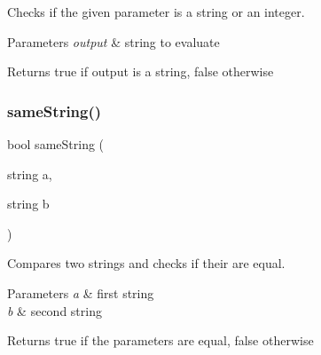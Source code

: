 Checks if the given parameter is a string or an integer. 


\begin{DoxyParams}{Parameters}
{\em output} & string to evaluate\\
\hline
\end{DoxyParams}
\begin{DoxyReturn}{Returns}
true if output is a string, false otherwise 
\end{DoxyReturn}
\mbox{\label{group___tools_ga0eaf893dd0f428f5f7b2e611c32c5ac5}} 
\subsubsection{\texorpdfstring{same\+String()}{sameString()}}
{\footnotesize\ttfamily bool same\+String (\begin{DoxyParamCaption}\item[{string}]{a,  }\item[{string}]{b }\end{DoxyParamCaption})}



Compares two strings and checks if their are equal. 


\begin{DoxyParams}{Parameters}
{\em a} & first string \\
\hline
{\em b} & second string\\
\hline
\end{DoxyParams}
\begin{DoxyReturn}{Returns}
true if the parameters are equal, false otherwise 
\end{DoxyReturn}
